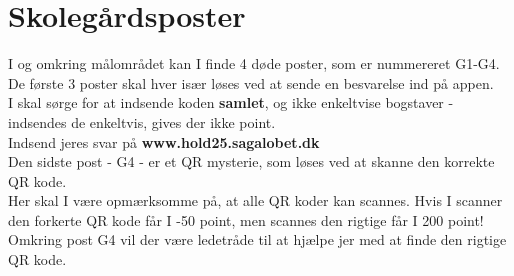 \section{Skolegårdsposter}
I og omkring målområdet kan I finde 4 døde poster, som er nummereret G1-G4.\\
De første 3 poster skal hver især løses ved at sende en besvarelse ind på appen.\\
I skal sørge for at indsende koden \textbf{samlet}, og ikke enkeltvise bogstaver - indsendes de enkeltvis, gives der ikke point.\\
\newline
Indsend jeres svar på \textbf{www.hold25.sagalobet.dk}\\
\newline
Den sidste post - G4 - er et QR mysterie, som løses ved at skanne den korrekte QR kode.\\
Her skal I være opmærksomme på, at alle QR koder kan scannes. Hvis I scanner den forkerte QR kode får I -50 point, men scannes den rigtige får I 200 point!\\
Omkring post G4 vil der være ledetråde til at hjælpe jer med at finde den rigtige QR kode.
